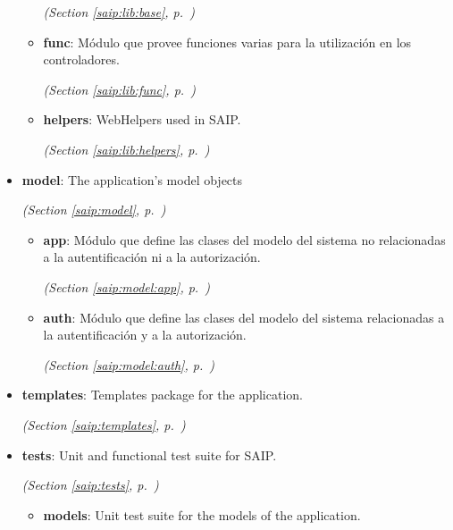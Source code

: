 \begin{itemize}
\begin{itemize}
  \textit{(Section \ref{saip:lib:base}, p.~\pageref{saip:lib:base})}

    \item \textbf{func}: Módulo que provee funciones varias para la utilización en los 
controladores.



  \textit{(Section \ref{saip:lib:func}, p.~\pageref{saip:lib:func})}

    \item \textbf{helpers}: WebHelpers used in SAIP.



  \textit{(Section \ref{saip:lib:helpers}, p.~\pageref{saip:lib:helpers})}

  \end{itemize}
\item \textbf{model}: The application's model objects



  \textit{(Section \ref{saip:model}, p.~\pageref{saip:model})}

  \begin{itemize}
\setlength{\parskip}{0ex}
    \item \textbf{app}: Módulo que define las clases del modelo del sistema no relacionadas a la 
autentificación ni a la autorización.



  \textit{(Section \ref{saip:model:app}, p.~\pageref{saip:model:app})}

    \item \textbf{auth}: Módulo que define las clases del modelo del sistema relacionadas a la 
autentificación y a la autorización.



  \textit{(Section \ref{saip:model:auth}, p.~\pageref{saip:model:auth})}

  \end{itemize}
\item \textbf{templates}: Templates package for the application.



  \textit{(Section \ref{saip:templates}, p.~\pageref{saip:templates})}

\item \textbf{tests}: Unit and functional test suite for SAIP.



  \textit{(Section \ref{saip:tests}, p.~\pageref{saip:tests})}

  \begin{itemize}
\setlength{\parskip}{0ex}
    \item \textbf{models}: Unit test suite for the models of the application.




\end{itemize}
\end{itemize}
